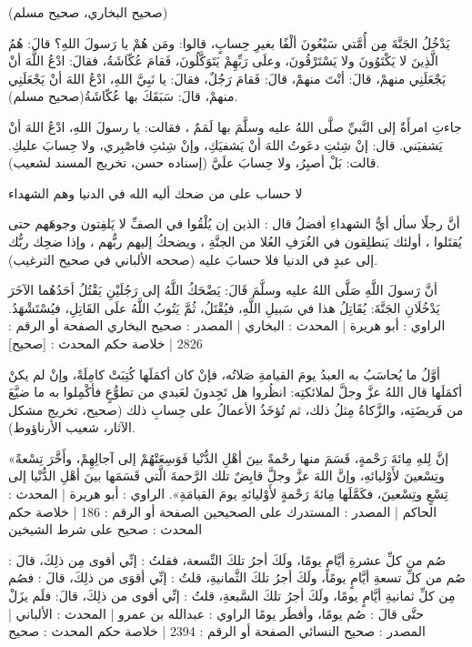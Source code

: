 {\footnotesize (صحيح البخاري، صحيح مسلم)}

يَدْخُلُ الجَنَّةَ مِن أُمَّتي سَبْعُونَ ألْفًا بغيرِ حِسابٍ، قالوا: ومَن هُمْ يا رَسولَ اللهِ؟ قالَ: هُمُ الَّذِينَ لا يَكْتَوُونَ ولا يَسْتَرْقُونَ، وعلَى رَبِّهِمْ يَتَوَكَّلُونَ، فَقامَ عُكّاشَةُ، فقالَ: ادْعُ اللَّهَ أنْ يَجْعَلَنِي منهمْ، قالَ: أنْتَ منهمْ، قالَ: فَقامَ رَجُلٌ، فقالَ: يا نَبِيَّ اللهِ، ادْعُ اللهَ أنْ يَجْعَلَنِي منهمْ، قالَ: سَبَقَكَ بها عُكّاشَةُ{\footnotesize (صحيح مسلم)}.


جاءتِ امرأَةٌ إلى النَّبيِّ صلَّى اللهُ عليه وسلَّمَ بها لَمَمٌ ، فقالت: يا رسولَ اللهِ، ادْعُ اللهَ أنْ يَشفيَني. قال: إنْ شِئتِ دعَوتُ اللهَ أنْ يَشفيَكِ، وإنْ شِئتِ فاصْبِري، ولا حِسابَ عليكِ. قالت: بَلْ أصبِرُ، ولا حِسابَ علَيَّ {\footnotesize (إسناده حسن، تخريج المسند لشعيب)}.


لا حساب على من ضحك أليه الله في الدنيا وهم الشهداء

أنَّ رجلًا سأل أيُّ الشهداءِ أفضلُ قال : الذين إن يُلْقُوا في الصفِّ لا يَلفِتون وجوهَهم حتى يُقتَلوا ، أولئك يَنطلِقون في الغُرَفِ العُلا من الجنَّةِ ، ويضحكُ إليهم ربُّهم ، وإذا ضحِك ربُّك إلى عبدٍ في الدنيا فلا حسابَ عليه 
{\footnotesize (صححه الألباني في صحيح الترغيب)}.

أنَّ رَسولَ اللَّهِ صَلَّى اللهُ عليه وسلَّمَ قَالَ: يَضْحَكُ اللَّهُ إلى رَجُلَيْنِ يَقْتُلُ أحَدُهُما الآخَرَ يَدْخُلَانِ الجَنَّةَ: يُقَاتِلُ هذا في سَبيلِ اللَّهِ، فيُقْتَلُ، ثُمَّ يَتُوبُ اللَّهُ علَى القَاتِلِ، فيُسْتَشْهَدُ.
الراوي : أبو هريرة | المحدث : البخاري | المصدر : صحيح البخاري
الصفحة أو الرقم : 2826 | خلاصة حكم المحدث : [صحيح] 


أوَّلُ ما يُحاسَبُ به العبدُ يومَ القيامةِ صَلاتُه، فإنْ كان أكمَلَها كُتِبَتْ كامِلَةً، وإنْ لم يكنْ أكمَلَها قال اللهُ عزَّ وجلَّ لملائكتِه: انظُروا هل تَجِدونَ لعَبدي من تطوُّعٍ فأكْمِلوا به ما ضيَّعَ من فَريضَتِه، والزَّكاةُ مِثلُ ذلك، ثم تُؤخَذُ الأعمالُ على حِسابِ ذلك {\footnotesize (صحيح، تخريج مشكل الآثار، شعيب الأرناؤوط)}.

«إنَّ لِلهِ مِائةَ رَحْمةٍ، قَسَمَ منها رحْمةً بينَ أهْلِ الدُّنْيا فَوَسِعَتْهُمْ إلى آجالِهِمْ، وأَخَّرَ تِسْعةً وتِسْعينَ لأَوْليائهِ، وإنَّ اللهَ عزَّ وجلَّ قابِضٌ تلك الرَّحمةَ الَّتي قَسَمَها بينَ أهْلِ الدُّنْيا إلى تِسْعٍ وتِسْعينَ، فكَمَّلَها مِائةَ رَحْمةٍ لأَوْليائهِ يومَ القيامَةِ».
الراوي : أبو هريرة | المحدث : الحاكم | المصدر : المستدرك على الصحيحين
الصفحة أو الرقم : 186 | خلاصة حكم المحدث : صحيح على شرط الشيخين


صُم من كلِّ عشرةِ أيَّامٍ يومًا، ولَكَ أجرُ تلكَ التِّسعة، فقلتُ : إنِّي أقوى مِن ذلِكَ، قالَ : صُم من كلِّ تسعةِ أيَّامٍ يومًا، ولَكَ أجرُ تلكَ الثَّمانيةِ، قلتُ : إنِّي أقوَى من ذلِكَ، قالَ : فصُم مِن كلِّ ثمانيةِ أيَّامٍ يومًا، ولَكَ أجرُ تلكَ السَّبعةِ، قلتُ : إنِّي أقوى من ذلِكَ، قالَ: فلَم يزَلْ حتَّى قالَ : صُم يومًا، وأفطَر يومًا
الراوي : عبدالله بن عمرو | المحدث : الألباني | المصدر : صحيح النسائي
الصفحة أو الرقم : 2394 | خلاصة حكم المحدث : صحيح 


